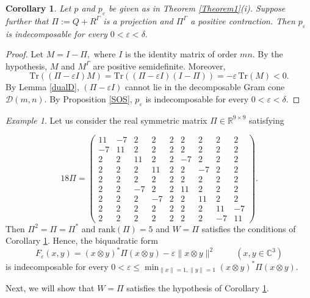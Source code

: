 \documentclass[12pt,a4paper]{amsart}
\theoremstyle{plain}
\newtheorem{corollary}[theorem]{Corollary}
\theoremstyle{remark}
\newtheorem{example}[theorem]{Example}
\theoremstyle{definition}
\def \C {\mathbb{C}}
\begin{document}
\begin{corollary}\label{IndecomBQF1}
Let $p$ and $p_{\varepsilon}$ be given as in Theorem \ref{Theorem1}(i). Suppose further that $\Pi:=Q+R^{\Gamma}$ is a projection and ${\Pi}^{\Gamma}$ a positive contraction. Then $p_{\varepsilon}$ is indecomposable for every $0<\varepsilon <\delta.$ 
\end{corollary}
\begin{proof}
		Let $M= I - \Pi,$ where $I$ is the identity matrix of order $mn.$
	By the hypothesis, $M$ and $M^{\Gamma}$ are positive semidefinite. 
	Moreover,
	\[
	\mathrm{Tr}((\Pi - \varepsilon I) M)
	=\mathrm{Tr}\left((\Pi-\varepsilon I)(I-\Pi)\right)
	=-\varepsilon\,\mathrm{Tr}(M)<0.
	\]
	By Lemma \ref{dualD}, $(\Pi - \varepsilon I)$ cannot lie in the decomposable Gram cone $\mathcal D (m,n).$ By Proposition \ref{SOS}, $p_{\varepsilon}$	is indecomposable for every $0<\varepsilon <\delta.$	
\end{proof}
\begin{example}\label{Exa1}
Let us consider the real symmetric matrix $\Pi\in\mathbb R^{9\times 9}$ satisfying

\[
18\Pi=
\begin{pmatrix}
	11 & -7 & 2 & 2 & 2 & 2 & 2 & 2 & 2\\
	-7 & 11 & 2 & 2 & 2 & 2 & 2 & 2 & 2\\
	2 & 2 & 11 & 2 & 2 & -7 & 2 & 2 & 2\\
	2 & 2 & 2 & 11 & 2 & 2 & -7 & 2 & 2\\
	2 & 2 & 2 & 2 & 2 & 2 & 2 & 2 & 2\\
	2 & 2 & -7 & 2 & 2 & 11 & 2 & 2 & 2\\
	2 & 2 & 2 & -7 & 2 & 2 & 11 & 2 & 2\\
	2 & 2 & 2 & 2 & 2 & 2 & 2 & 11 & -7\\
	2 & 2 & 2 & 2 & 2 & 2 & 2 & -7 & 11
\end{pmatrix}.
\]
Then $\Pi^2=\Pi = \Pi^*$ and $\mathrm{rank}(\Pi)=5$ and $W=\Pi$ satisfies the conditions of Corollary \ref{IndecomBQF1}. Hence, the biquadratic form 
$$F_{\varepsilon} (x,y) = (x\otimes y)^* \Pi (x\otimes y) -\varepsilon \| x\otimes y \|^2\hspace{1cm} (x,y\in \C^3)$$
 is indecomposable for every $0< \varepsilon \le  \min_{\| x\| =1, \| y \| =1 } (x\otimes y)^* \Pi (x\otimes y).$
\end{example}
Next, we will show that $W=\Pi$ satisfies the hypothesis of Corollary \ref{IndecomBQF1}.
\end{document}
